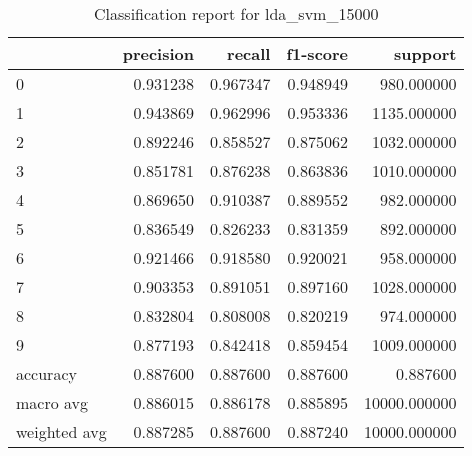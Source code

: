 \begin{table}[htb!]
\centering
\caption{Classification report for lda_svm_15000}
\label{tab:classification-report-lda_svm_15000}
\begin{tabular}{lrrrr}
\toprule
 & precision & recall & f1-score & support \\
\midrule
0 & 0.931238 & 0.967347 & 0.948949 & 980.000000 \\
1 & 0.943869 & 0.962996 & 0.953336 & 1135.000000 \\
2 & 0.892246 & 0.858527 & 0.875062 & 1032.000000 \\
3 & 0.851781 & 0.876238 & 0.863836 & 1010.000000 \\
4 & 0.869650 & 0.910387 & 0.889552 & 982.000000 \\
5 & 0.836549 & 0.826233 & 0.831359 & 892.000000 \\
6 & 0.921466 & 0.918580 & 0.920021 & 958.000000 \\
7 & 0.903353 & 0.891051 & 0.897160 & 1028.000000 \\
8 & 0.832804 & 0.808008 & 0.820219 & 974.000000 \\
9 & 0.877193 & 0.842418 & 0.859454 & 1009.000000 \\
accuracy & 0.887600 & 0.887600 & 0.887600 & 0.887600 \\
macro avg & 0.886015 & 0.886178 & 0.885895 & 10000.000000 \\
weighted avg & 0.887285 & 0.887600 & 0.887240 & 10000.000000 \\
\bottomrule
\end{tabular}
\end{table}
